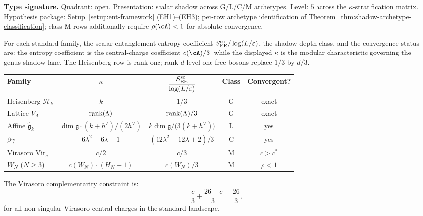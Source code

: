 \begin{theorem}
\label{thm:ent-landscape-census}
\textbf{Type signature.}  Quadrant: open.  Presentation: scalar shadow
across G/L/C/M archetypes.  Level: $5$ across the
$\kappa$-stratification matrix.  Hypothesis package:
Setup~\ref{setup:ent-framework} (EH1)--(EH3); per-row archetype
identification of Theorem~\ref{thm:shadow-archetype-classification};
class-M rows additionally require $\rho(\cA)<1$ for absolute
convergence.

For each standard family, the scalar entanglement entropy
coefficient $S_{\mathrm{EE}}^{\mathrm{sc}} / \log(L/\varepsilon)$,
the shadow depth class, and the convergence status are:
the entropy coefficient is the central-charge coefficient
$c(\cA)/3$, while the displayed $\kappa$ is the modular
characteristic governing the genus-shadow lane.  The
Heisenberg row is rank one; rank-$d$ level-one free bosons
replace $1/3$ by $d/3$.

\begin{center}
\renewcommand{\arraystretch}{1.3}
\begin{tabular}{l@{\;\;}c@{\;\;}c@{\;\;}c@{\;\;}c}
\textbf{Family} & $\kappa$ &
$\dfrac{S_{\mathrm{EE}}^{\mathrm{sc}}}{\log(L/\varepsilon)}$
& \textbf{Class}
& \textbf{Convergent?} \\
\midrule
Heisenberg $\mathcal{H}_k$
& $k$ & $1/3$ & G & \textup{exact} \\
Lattice $V_\Lambda$
& $\operatorname{rank}(\Lambda)$ & $\operatorname{rank}(\Lambda)/3$ & G & \textup{exact} \\
Affine $\widehat{\mathfrak{g}}_k$
& $\dim\mathfrak{g}\cdot(k{+}h^\vee)/(2h^\vee)$
& $k\dim\mathfrak{g}/\bigl(3(k{+}h^\vee)\bigr)$ & L & yes \\
$\beta\gamma$
& $6\lambda^2-6\lambda+1$
& $(12\lambda^2-12\lambda+2)/3$ & C & yes \\
Virasoro $\mathrm{Vir}_c$
& $c/2$ & $c/3$ & M
& $c > c^*$ \\
$W_N$ \textup{($N \ge 3$)}
& $c(W_N) \cdot (H_N{-}1)$
& $c(W_N)/3$ & M
& $\rho < 1$ \\
\end{tabular}
\end{center}
The Virasoro complementarity constraint is:
\begin{equation}\label{eq:ent-virasoro-census}
\frac{c}{3} + \frac{26-c}{3}
= \frac{26}{3},
\end{equation}
for all non-singular Virasoro central charges in the standard
landscape.
\end{theorem}

